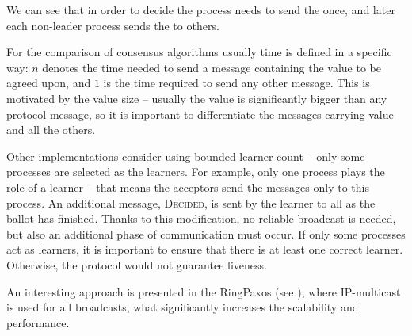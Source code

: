 We can see that in order to decide the process needs to send the \propose[] once, and later each non-leader process sends the \accept to others.

For the comparison of consensus algorithms usually time is defined in a specific way: $n$ denotes the time needed to send a message containing the value to be agreed upon, and $1$ is the time required to send any other message. This is motivated by the value size -- usually the value is significantly bigger than any protocol message, so it is important to differentiate the messages carrying value and all the others.

Other implementations consider using bounded learner count -- only some processes are selected as the learners. For example, only one process plays the role of a learner -- that means the acceptors send the \accept messages only to this process. An additional message, \textsc{Decided}, is sent by the learner to all as the ballot has finished. Thanks to this modification, no reliable broadcast is needed, but also an additional phase of communication must occur. If only some processes act as learners, it is important to ensure that there is at least one correct learner. Otherwise, the protocol would not guarantee liveness.

An interesting approach is presented in the RingPaxos (see \cite{Mar10}), where IP-multicast is used for all broadcasts, what significantly increases the scalability and performance.
